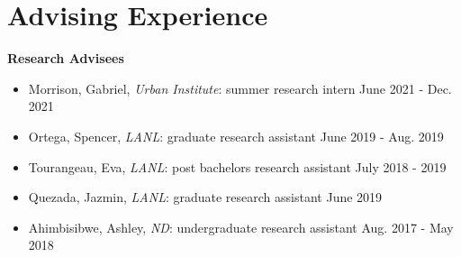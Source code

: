 \documentclass[11pt, letterpaper, roman]{moderncv} %
\begin{document}
\vspace{-15pt}
\section{Advising Experience}

\textbf{Research Advisees}

    \begin{itemize}
        \item Morrison, Gabriel, \textit{Urban Institute}: summer research intern \hfill June 2021 - Dec. 2021
        \item Ortega, Spencer, \textit{LANL}: graduate research assistant \hfill June 2019 - Aug. 2019
        \item Tourangeau, Eva, \textit{LANL}: post bachelors research assistant \hfill July 2018 - 2019
        \item Quezada, Jazmin, \textit{LANL}: graduate research assistant \hfill June 2019
        \item Ahimbisibwe, Ashley, \textit{ND}: undergraduate research assistant \hfill Aug. 2017 - May 2018
    \end{itemize}
\end{document}
